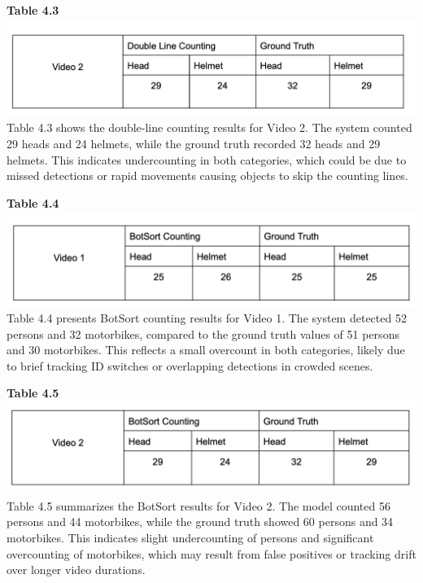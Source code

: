 \vspace{0.5em}
\noindent\textbf{Table 4.3} \\
\includegraphics[width=1\textwidth]{test2.png}
Table 4.3 shows the double-line counting results for Video 2. The system counted 29 heads and 24 helmets, while the ground truth recorded 32 heads and 29 helmets. This indicates undercounting in both categories, which could be due to missed detections or rapid movements causing objects to skip the counting lines.


\vspace{0.5em}
\noindent\textbf{Table 4.4} \\
\includegraphics[width=1\textwidth]{test3.png}
Table 4.4 presents BotSort counting results for Video 1. The system detected 52 persons and 32 motorbikes, compared to the ground truth values of 51 persons and 30 motorbikes. This reflects a small overcount in both categories, likely due to brief tracking ID switches or overlapping detections in crowded scenes.

\newpage
\vspace{0.5em}
\noindent\textbf{Table 4.5} \\
\includegraphics[width=1\textwidth]{test4.png}
Table 4.5 summarizes the BotSort results for Video 2. The model counted 56 persons and 44 motorbikes, while the ground truth showed 60 persons and 34 motorbikes. This indicates slight undercounting of persons and significant overcounting of motorbikes, which may result from false positives or tracking drift over longer video durations.


